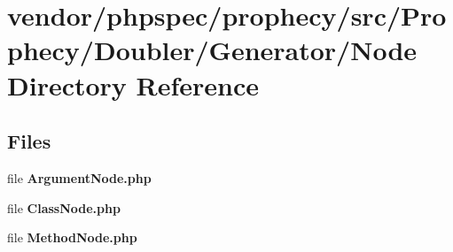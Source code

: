 \section{vendor/phpspec/prophecy/src/\+Prophecy/\+Doubler/\+Generator/\+Node Directory Reference}
\label{dir_9eee6187c9f02f5eac4bcc4128a8c677}
\subsection*{Files}
\begin{DoxyCompactItemize}
\item 
file {\bf Argument\+Node.\+php}
\item 
file {\bf Class\+Node.\+php}
\item 
file {\bf Method\+Node.\+php}
\end{DoxyCompactItemize}
